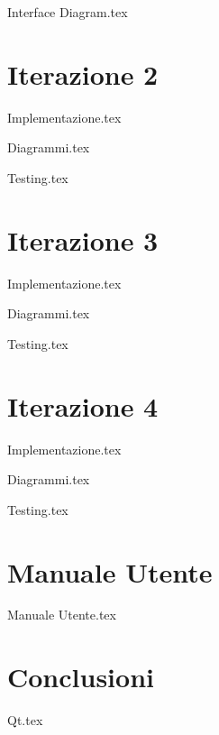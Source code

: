 \documentclass{report}
\begin{document}
	{Interface Diagram.tex}
	
	\clearpage
	
	
	
	\chapter{Iterazione 2}
	{Implementazione.tex}
	
	\clearpage
	
	{Diagrammi.tex}
	
	\clearpage
	
	{Testing.tex}
	
	\clearpage
	
	\chapter{Iterazione 3}
	{Implementazione.tex}
	
	\clearpage
	
	{Diagrammi.tex}
	
	\clearpage
	
	{Testing.tex}
	
	\clearpage
	
	\chapter{Iterazione 4}
	{Implementazione.tex}
	
	\clearpage
	
	{Diagrammi.tex}
	
	\clearpage
	
	{Testing.tex}
	
	\clearpage
	\chapter{Manuale Utente}
	{Manuale Utente.tex}
	\clearpage
	\chapter{Conclusioni}
	{Qt.tex}
		
	
\end{document}
